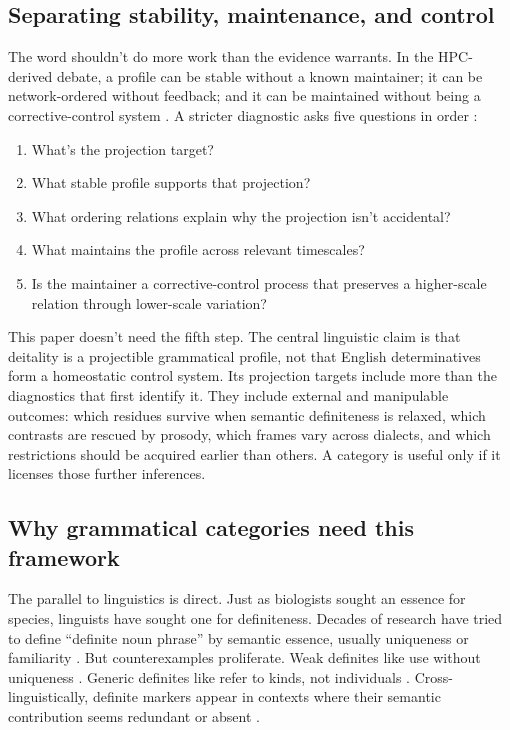 \documentclass[12pt,letterpaper]{article}
\newcommand{\MetaphysicsSelfCite}{%
  \ifdefined\blindsubmission
    \parencite{anonymous2026notEveryStableCluster}%
  \else
    \parencite{reynolds2026notEveryStableCluster}%
  \fi}
\begin{document}
\subsection{Separating stability, maintenance, and control}

The word  shouldn't do more work than the evidence warrants. In the HPC-derived debate, a profile can be stable without a known maintainer; it can be network-ordered without feedback; and it can be maintained without being a corrective-control system \parencite{slater2015,khalidi2013,khalidi2018nodes,onishi2022}. A stricter diagnostic asks five questions in order \MetaphysicsSelfCite{}:

\begin{enumerate}[label=(\roman*)]
\item What's the projection target?
\item What stable profile supports that projection?
\item What ordering relations explain why the projection isn't accidental?
\item What maintains the profile across relevant timescales?
\item Is the maintainer a corrective-control process that preserves a higher-scale relation through lower-scale variation?
\end{enumerate}

This paper doesn't need the fifth step. The central linguistic claim is that deitality is a projectible grammatical profile, not that English determinatives form a homeostatic control system. Its projection targets include more than the diagnostics that first identify it. They include external and manipulable outcomes: which residues survive when semantic definiteness is relaxed, which contrasts are rescued by prosody, which frames vary across dialects, and which restrictions should be acquired earlier than others. A category is useful only if it licenses those further inferences.

\subsection{Why grammatical categories need this framework}

The parallel to linguistics is direct. Just as biologists sought an essence for species, linguists have sought one for definiteness. Decades of research have tried to define \enquote{definite noun phrase} by semantic essence, usually uniqueness \parencite{russell1905,hawkins1978} or familiarity \parencite{christophersen1939,heim1982}. But counterexamples proliferate. Weak definites like  use  without uniqueness \parencite{carlsonsussman2005,aguilarguevarazwarts2010}. Generic definites like  refer to kinds, not individuals \parencite{carlson1977,krifka2004}. Cross-linguistically, definite markers appear in contexts where their semantic contribution seems redundant or absent \parencite{lyons1999}.
\end{document}
